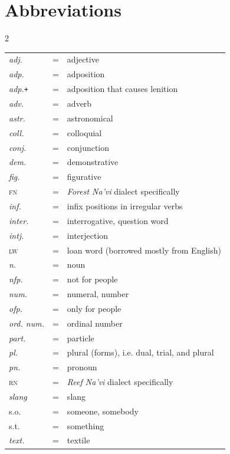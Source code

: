 \newpage
{}
\section*{Abbreviations}

\begin{multicols}{2}
\begin{footnotesize}
\begin{tabular}{ l c l }
  \emph{adj.} & = & adjective \\
  \emph{adp.} & = & adposition \\
  \emph{adp.}\texttt{+} & = & adposition that causes lenition \\
  \emph{adv.} & = & adverb \\
  \emph{astr.} & = & astronomical \\
  \emph{coll.} & = & colloquial \\
  \emph{conj.} & = &  conjunction\\
  \emph{dem.} & = & demonstrative \\
  \emph{fig.} & = & figurative \\
  \textsc{fn} & = & \emph{Forest Na'vi} dialect specifically \\
  \emph{inf.} & = &  infix positions in irregular verbs\\
  \emph{inter.} & = & interrogative, question word \\
  \emph{intj.} & = & interjection \\
  \textsc{lw} & = & loan word (borrowed mostly from English) \\
  \emph{n.} & = & noun \\
  \emph{nfp.} & = & not for people \\
  \emph{num.} & = & numeral, number \\
  \emph{ofp.} & = & only for people \\
  \emph{ord. num.} & = & ordinal number \\
  \emph{part.} & = &  particle \\
  \emph{pl.} & = & plural (forms), i.e. dual, trial, and plural \\
  \emph{pn.} & = & pronoun \\
  \textsc{rn} & = & \emph{Reef Na'vi} dialect specifically \\
  \emph{slang} & = & slang \\
  s.o. & = & someone, somebody \\
  s.t. & = & something \\
  \emph{text.} & = & textile \\

\end{tabular}
\end{footnotesize}
\end{multicols}
